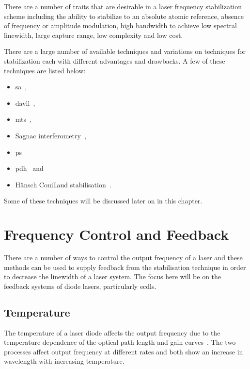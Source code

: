 There are a number of traits that are desirable in a laser frequency stabilization scheme including the ability to stabilize to an absolute atomic reference, absence of frequency or amplitude modulation, high bandwidth to achieve low spectral linewidth, large capture range, low complexity and low cost.

There are a large number of available techniques and variations on techniques for stabilization each with different advantages and drawbacks.
A few of these techniques are listed below:
\begin{itemize}
\item \gls{sa}~\cite{haroche_theory_1972, maguire_theoretical_2006, cuneo_optically_1994, preston_doppler-free_1996, saliba_linewidths_2009},
\item \gls{davll}~\cite{corwin_frequency-stabilized_1998, millett-sikking_davll_2007},
\item \gls{mts}~\cite{shirley_modulation_1982, mccarron_modulation_2008, xiang-hui_ultra-stable_2009},
\item Sagnac interferometry~\cite{robins_Interferometric_2002, jundt_non-linear_2003},
\item \acrfull{ps}~\cite{wieman_doppler-free_1976, lancaster_polarisation_1999, yoshikawa_frequency_2003, harris_polarization_2006, pearman_polarization_2002, tiwari_laser_2006, do_polarization_2008, torii_laser-phase_2012}
\item \gls{pdh}~\cite{drever_laser_1983} and
\item H\"ansch Couillaud stabilisation~\cite{hansch_laser_1980}.
\end{itemize}
Some of these techniques will be discussed later on in this chapter.

\section{Frequency Control and Feedback}

There are a number of ways to control the output frequency of a laser and these methods can be used to supply feedback from the stabilisation technique in order to decrease the linewidth of a laser system.
The focus here will be on the feedback systems of diode lasers, particularly \glspl{ecdl}.

\subsection{Temperature}
The temperature of a laser diode affects the output frequency due to the temperature dependence of the optical path length and gain curves~\cite{wieman_using_1991}.
The two processes affect output frequency at different rates and both show an increase in wavelength with increasing temperature.

